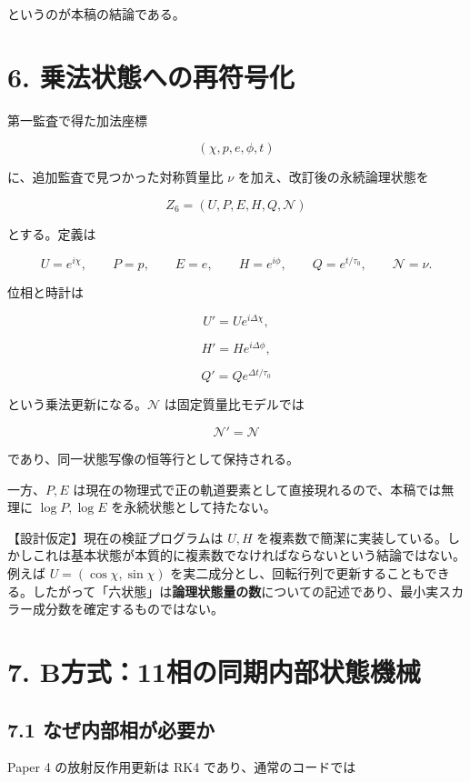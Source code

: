 \documentclass[
  a4paper,
]{ltjsarticle}
\begin{document}
というのが本稿の結論である。

\section{6.
乗法状態への再符号化}\label{ux4e57ux6cd5ux72b6ux614bux3078ux306eux518dux7b26ux53f7ux5316}

第一監査で得た加法座標

\[
(\chi,p,e,\phi,t)
\]

に、追加監査で見つかった対称質量比 \(\nu\)
を加え、改訂後の永続論理状態を

\[
\boxed{
Z_6=(U,P,E,H,Q,\mathcal N)
}
\]

とする。定義は

\[
U=e^{i\chi},
\qquad P=p,
\qquad E=e,
\qquad H=e^{i\phi},
\qquad Q=e^{t/\tau_0},
\qquad \mathcal N=\nu.
\]

位相と時計は

\[
U'=Ue^{i\Delta\chi},
\]

\[
H'=He^{i\Delta\phi},
\]

\[
Q'=Qe^{\Delta t/\tau_0}
\]

という乗法更新になる。\(\mathcal N\) は固定質量比モデルでは

\[
\mathcal N'=\mathcal N
\]

であり、同一状態写像の恒等行として保持される。

一方、\(P,E\)
は現在の物理式で正の軌道要素として直接現れるので、本稿では無理に
\(\log P,\log E\) を永続状態として持たない。

【設計仮定】現在の検証プログラムは \(U,H\)
を複素数で簡潔に実装している。しかしこれは基本状態が本質的に複素数でなければならないという結論ではない。例えば
\(U=(\cos\chi,\sin\chi)\)
を実二成分とし、回転行列で更新することもできる。したがって「六状態」は\textbf{論理状態量の数}についての記述であり、最小実スカラー成分数を確定するものではない。

\section{7.
B方式：11相の同期内部状態機械}\label{bux65b9ux5f0f11ux76f8ux306eux540cux671fux5185ux90e8ux72b6ux614bux6a5fux68b0}

\subsection{7.1
なぜ内部相が必要か}\label{ux306aux305cux5185ux90e8ux76f8ux304cux5fc5ux8981ux304b}

Paper 4 の放射反作用更新は RK4 であり、通常のコードでは
\end{document}
